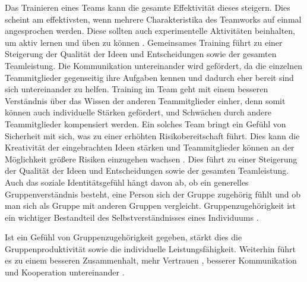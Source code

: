 \documentclass[a4paper,11pt]{article}%
\renewcommand{\\}{\vspace*{0.5\baselineskip} \newline}
\begin{document}
Das Trainieren eines Teams kann die gesamte Effektivität dieses steigern. Dies scheint am effektivsten, wenn mehrere Charakteristika des Teamworks auf einmal angesprochen werden. Diese sollten auch experimentelle Aktivitäten beinhalten, um aktiv lernen und üben zu können \citep[19]{mcewan2017effectiveness}.
Gemeinsames Training führt zu einer Steigerung der Qualität der Ideen und Entscheidungen sowie der gesamten Teamleistung.
Die Kommunikation untereinander wird gefördert, da die einzelnen Teammitglieder gegenseitig ihre Aufgaben kennen und dadurch eher bereit sind sich untereinander zu helfen.
Training im Team geht mit einem besseren Verständnis über das Wissen der anderen Teammitglieder einher, denn somit können auch individuelle Stärken gefördert, und Schwächen durch andere Teammitglieder kompensiert werden.
Ein solches Team bringt ein Gefühl von Sicherheit mit sich, was zu einer erhöhten Risikobereitschaft führt. Dies kann die Kreativität der eingebrachten Ideen stärken und Teammitglieder können an der Möglichkeit größere Risiken einzugehen wachsen \citep[S. 2-4]{biech2007pfeiffer}.
Dies führt zu einer Steigerung der Qualität der Ideen und Entscheidungen sowie der gesamten Teamleistung.
Auch das soziale Identitätsgefühl hängt davon ab, ob ein generelles Gruppenverständnis besteht, eine Person sich der Gruppe zugehörig fühlt und ob man sich als Gruppe mit anderen Gruppen vergleicht. Gruppenzugehörigkeit ist ein wichtiger Bestandteil des Selbstverständnisses eines Individuums \citep{sutantovicious}.
	
Ist ein Gefühl von Gruppenzugehörigkeit gegeben, stärkt dies die Gruppenproduktivität sowie die individuelle Leistungsfähigkeit. Weiterhin führt es zu einem besseren Zusammenhalt, mehr Vertrauen \citep{herbsleb2000distance}, besserer Kommunikation und Kooperation untereinander \citep[S. 510]{olson2003psychological}.
\end{document}
